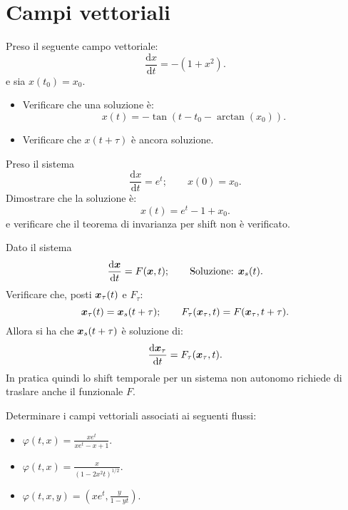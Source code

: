 \section{Campi vettoriali}%
\begin{ex}
    Preso il seguente campo vettoriale:
    \[
	\frac{\text{d} x}{\text{d} t} = - (1+x^2)
    .\] 
    e sia $x(t_0)=x_0$.
    \begin{itemize}
        \item Verificare che una soluzione è:
	    \[
		x(t)=- \tan(t-t_0-\arctan (x_0))
	    .\] 
	\item Verificare che $x(t+\tau)$ è ancora soluzione.
    \end{itemize}
\end{ex}
\noindent
\begin{ex}
    Preso il sistema
    \[
	\frac{\text{d} x}{\text{d} t} = e^t; \qquad  x(0)=x_0
    .\] 
    Dimostrare che la soluzione è:
    \[
	x(t)=e^t-1+x_0
    .\] 
    e verificare che il teorema di invarianza per shift non è verificato.
\end{ex}
\noindent
\begin{ex}
   Dato il sistema 
   \[
       \frac{\text{d} \boldsymbol{x}}{\text{d} t} = F(\boldsymbol{x}, t); \qquad \text{Soluzione: }\boldsymbol{x}_s(t)
   .\] 
   Verificare che, posti $\boldsymbol{x}_{\tau}(t)$ e $F_{\tau}$:
   \[
       \boldsymbol{x}_{\tau}(t)=\boldsymbol{x}_s(t+\tau); \qquad F_{\tau}(\boldsymbol{x}_{\tau}, t) = F(\boldsymbol{x}_\tau, t+\tau)
   .\] 
   Allora si ha che $\boldsymbol{x}_s(t+\tau)$ è soluzione di:
   \[
       \frac{\text{d} \boldsymbol{x}_\tau}{\text{d} t} = F_\tau (\boldsymbol{x}_\tau, t)
   .\] 
   In pratica quindi lo shift temporale per un sistema non autonomo richiede di traslare anche il funzionale $F$. 
\end{ex}
\noindent
\begin{ex}
    Determinare i campi vettoriali associati ai seguenti flussi:
    \begin{itemize}
	\item $\varphi (t, x) = \frac{x e^{t}}{xe^t - x + 1}$.
	\item $\varphi (t, x) = \frac{x}{(1-2x^2t)^{1 /2}}$.
	\item $\varphi (t, x, y) = (xe^t, \frac{y}{1-yt})$.
    \end{itemize}
\end{ex}
\noindent
